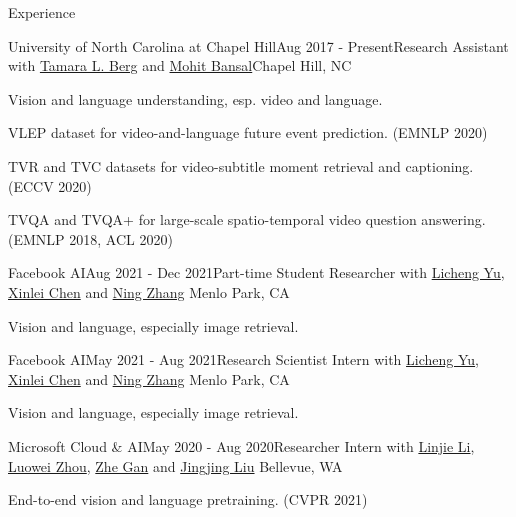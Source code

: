 \documentclass{resume} %
\begin{document}
\begin{rSection}{Experience}

\begin{rSubsection}{University of North Carolina at Chapel Hill}{Aug 2017 - Present}{Research Assistant with \href{http://www.tamaraberg.com/}{Tamara L. Berg} and \href{http://www.cs.unc.edu/~mbansal/}{Mohit Bansal}}{Chapel Hill, NC}
\item Vision and language understanding, esp. video and language.
\item VLEP dataset for video-and-language future event prediction. (EMNLP 2020)
\item TVR and TVC datasets for video-subtitle moment retrieval and captioning. (ECCV 2020)
\item TVQA and TVQA+ for large-scale spatio-temporal video question answering. (EMNLP 2018, ACL 2020)
\end{rSubsection}



\begin{rSubsection}{Facebook AI}{Aug 2021 - Dec 2021}{Part-time Student Researcher with 
    \href{https://lichengunc.github.io/}{Licheng Yu},
    \href{http://xinleic.xyz/}{Xinlei Chen} and \href{https://scholar.google.com/citations?user=DplAah0AAAAJ&hl=en}{Ning Zhang}} {Menlo Park, CA}
    \item Vision and language, especially image retrieval.
    \end{rSubsection}


\begin{rSubsection}{Facebook AI}{May 2021 - Aug 2021}{Research Scientist Intern with 
    \href{https://lichengunc.github.io/}{Licheng Yu},
    \href{http://xinleic.xyz/}{Xinlei Chen} and \href{https://scholar.google.com/citations?user=DplAah0AAAAJ&hl=en}{Ning Zhang}} {Menlo Park, CA}
    \item Vision and language, especially image retrieval.
    \end{rSubsection}



\begin{rSubsection}{Microsoft Cloud \& AI}{May 2020 - Aug 2020}{Researcher Intern with 
    \href{https://scholar.google.com/citations?user=WR875gYAAAAJ&hl=en}{Linjie Li},
    \href{https://luoweizhou.github.io/}{Luowei Zhou}, \href{http://zhegan27.github.io/}{Zhe Gan} and
    \href{https://www.linkedin.com/in/jingjing-liu-65703431/}{Jingjing Liu}} {Bellevue, WA}
    \item End-to-end vision and language pretraining. (CVPR 2021)
    \end{rSubsection}



\end{rSection}
\end{document}
